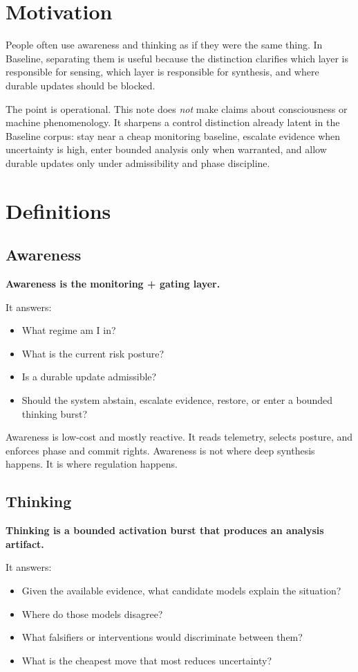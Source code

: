 \documentclass[11pt]{article}
\begin{document}
\section{Motivation}
People often use awareness and thinking as if they were the same thing. In Baseline, separating them is useful because the distinction clarifies which layer is responsible for sensing, which layer is responsible for synthesis, and where durable updates should be blocked.

The point is operational. This note does \emph{not} make claims about consciousness or machine phenomenology. It sharpens a control distinction already latent in the Baseline corpus: stay near a cheap monitoring baseline, escalate evidence when uncertainty is high, enter bounded analysis only when warranted, and allow durable updates only under admissibility and phase discipline.

\section{Definitions}
\subsection{Awareness}
\textbf{Awareness is the monitoring + gating layer.}

It answers:
\begin{itemize}[leftmargin=2em]
  \item What regime am I in?
  \item What is the current risk posture?
  \item Is a durable update admissible?
  \item Should the system abstain, escalate evidence, restore, or enter a bounded thinking burst?
\end{itemize}

Awareness is low-cost and mostly reactive. It reads telemetry, selects posture, and enforces phase and commit rights. Awareness is not where deep synthesis happens. It is where regulation happens.

\subsection{Thinking}
\textbf{Thinking is a bounded activation burst that produces an analysis artifact.}

It answers:
\begin{itemize}[leftmargin=2em]
  \item Given the available evidence, what candidate models explain the situation?
  \item Where do those models disagree?
  \item What falsifiers or interventions would discriminate between them?
  \item What is the cheapest move that most reduces uncertainty?
\end{itemize}
\end{document}

